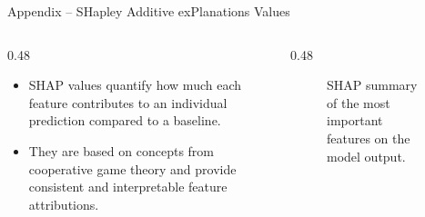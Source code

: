 \documentclass[10pt, aspectratio=169]{beamer}
\begin{document}
\begin{frame}{Appendix -- SHapley Additive exPlanations Values}
    \begin{columns}
        \begin{column}{0.48\textwidth}
            \begin{itemize}
                \item SHAP values quantify how much each feature contributes to an individual prediction compared to a baseline.
                \item They are based on concepts from cooperative game theory and provide consistent and interpretable feature attributions.
            \end{itemize}
        \end{column}
        \begin{column}{0.48\textwidth}
            \begin{figure}
                \centering
                
                \caption{SHAP summary of the most important features on the model output.}
                \label{fig:shap}
            \end{figure}
        \end{column}
    \end{columns}
    \nocite{neymeyer_2026_electricity}
\end{frame}
\end{document}

